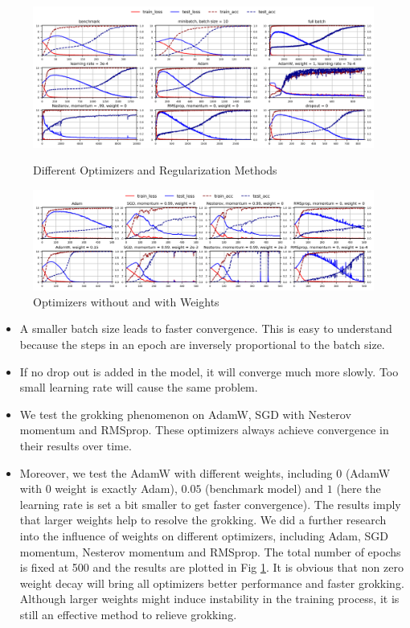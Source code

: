 \documentclass{article}
\begin{document}
\begin{figure}[htbp]
  \centering
  \includegraphics[width=\textwidth]{./pic/optimizer.png}
  \caption{Different Optimizers and Regularization Methods}
  \label{optimizer}
  \includegraphics[width=\textwidth]{./pic/weight.png}
  \caption{Optimizers without and with Weights}
  \label{weight}
\end{figure}

\begin{itemize}
    \item A smaller batch size leads to faster convergence. This is easy to understand because the steps in an epoch are inversely proportional to the batch size.

    \item If no drop out is added in the model, it will converge much more slowly. Too small learning rate will cause the same problem.

    \item We test the grokking phenomenon on AdamW, SGD with Nesterov momentum and RMSprop. These optimizers always achieve convergence in their results over time.
    
    \item Moreover, we test the AdamW with different weights, including $0$ (AdamW with $0$ weight is exactly Adam), $0.05$ (benchmark model) and $1$ (here the learning rate is set a bit smaller to get faster convergence). The results imply that larger weights help to resolve the grokking. We did a further research into the influence of weights on different optimizers, including Adam, SGD momentum, Nesterov momentum and RMSprop. The total number of epochs is fixed at 500 and the results are plotted in Fig \ref{weight}. It is obvious that non zero weight decay will bring all optimizers better performance and faster grokking. Although larger weights might induce instability in the training process, it is still an effective method to relieve grokking. 
\end{itemize}
\end{document}
